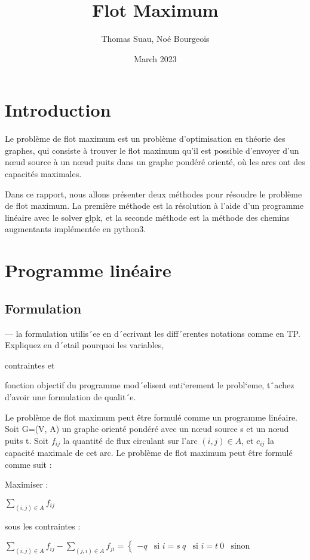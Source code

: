 \documentclass{article}
\begin{document}
\title{Flot Maximum}
\author{Thomas Suau, Noé Bourgeois }
\date{March 2023}

    \maketitle
    \tableofcontents
    \newpage

    \section{Introduction}
    Le problème de flot maximum est un problème d'optimisation en théorie des graphes,
    qui consiste à trouver le flot maximum qu'il est possible d'envoyer d'un nœud source à un nœud puits
    dans un graphe pondéré orienté,
    où les arcs ont des capacités maximales.

    Dans ce rapport, nous allons présenter deux méthodes
    pour résoudre le problème de flot maximum.
    La première méthode est la résolution à l'aide d'un programme linéaire avec le solver glpk,
    et la seconde méthode est la méthode des chemins augmentants implémentée en python3.


    \section{Programme linéaire}
    \subsection{Formulation}
       — la formulation utilis´ee en d´ecrivant les diff´erentes notations comme en TP.
       Expliquez en d´etail pourquoi les
       variables,

       contraintes et

       fonction objectif du programme mod´elisent enti`erement le
    probl`eme, tˆachez d’avoir une formulation de qualit´e.


        Le problème de flot maximum peut être formulé comme un programme linéaire.
       Soit G=(V, A) un graphe orienté pondéré avec un nœud source s et un nœud puits t.
       Soit $f_{ij}$ la quantité de flux circulant sur l'arc $(i,j) \in A$,
       et $c_{ij}$ la capacité maximale de cet arc.
       Le problème de flot maximum peut être formulé comme suit :

    Maximiser :

$\sum_{(i,j) \in A} f_{ij}$

sous les contraintes :

$\sum_{(i,j) \in A} f_{ij} - \sum_{(j,i) \in A} f_{ji} =
\begin{cases}
-q & \text{si } i=s \
q & \text{si } i=t \
0 & \text{sinon}
\end{cases}$
\end{document}
